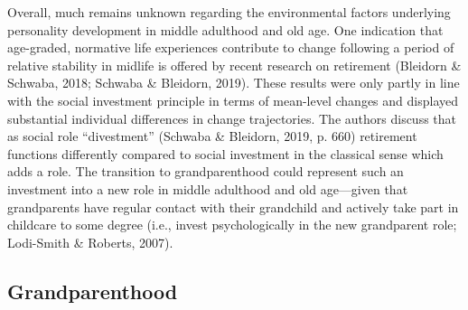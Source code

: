 \documentclass[
  english,
  man, noextraspace]{apa7}
\begin{document}
Overall, much remains unknown regarding the environmental factors underlying personality development in middle adulthood and old age. One indication that age-graded, normative life experiences contribute to change following a period of relative stability in midlife is offered by recent research on retirement (Bleidorn \& Schwaba, 2018; Schwaba \& Bleidorn, 2019). These results were only partly in line with the social investment principle in terms of mean-level changes and displayed substantial individual differences in change trajectories. The authors discuss that as social role \enquote{divestment} (Schwaba \& Bleidorn, 2019, p. 660) retirement functions differently compared to social investment in the classical sense which adds a role. The transition to grandparenthood could represent such an investment into a new role in middle adulthood and old age---given that grandparents have regular contact with their grandchild and actively take part in childcare to some degree (i.e., invest psychologically in the new grandparent role; Lodi-Smith \& Roberts, 2007).

\hypertarget{grandparenthood}{%
\subsection{Grandparenthood}\label{grandparenthood}}
\end{document}
